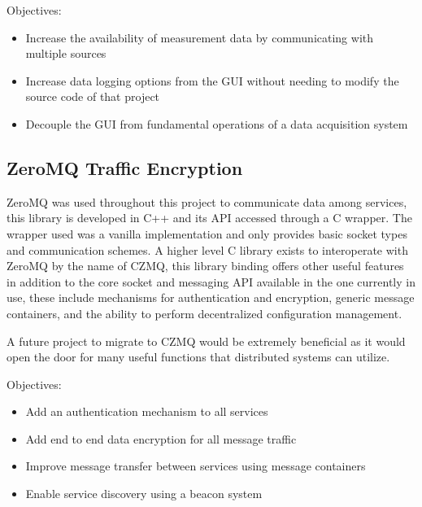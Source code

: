     Objectives:

    \begin{itemize}
      \item Increase the availability of measurement data by communicating with
        multiple sources
      \item Increase data logging options from the GUI without needing to modify
        the source code of that project
      \item Decouple the GUI from fundamental operations of a data acquisition
        system
    \end{itemize}

  \subsection{ZeroMQ Traffic Encryption}\label{sec:future-czmq}

    ZeroMQ was used throughout this project to communicate data among services,
    this library is developed in C++ and its API accessed through a C wrapper.
    The wrapper used was a vanilla implementation and only provides basic
    socket types and communication schemes. A higher level C library exists to
    interoperate with ZeroMQ by the name of CZMQ, this library binding offers
    other useful features in addition to the core socket and messaging API
    available in the one currently in use, these include mechanisms for
    authentication and encryption, generic message containers, and the ability
    to perform decentralized configuration management.

    A future project to migrate to CZMQ would be extremely beneficial as it
    would open the door for many useful functions that distributed systems
    can utilize.

    Objectives:

    \begin{itemize}
      \item Add an authentication mechanism to all services
      \item Add end to end data encryption for all message traffic
      \item Improve message transfer between services using message containers
      \item Enable service discovery using a beacon system
    \end{itemize}
